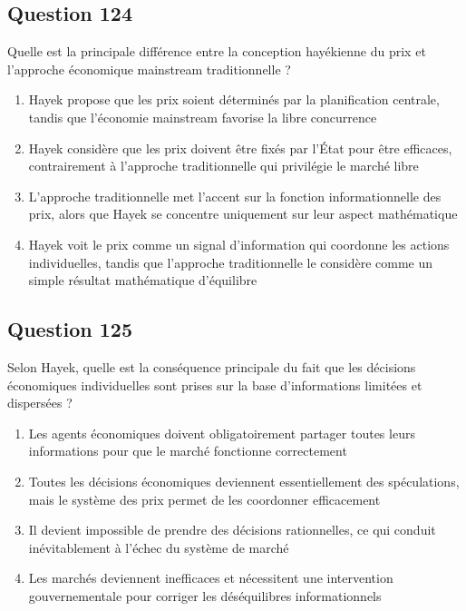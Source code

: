\documentclass[12pt,a4paper]{article}
\begin{document}
\bigskip


\subsection*{Question 124}
Quelle est la principale différence entre la conception hayékienne du prix et l'approche économique mainstream traditionnelle ?

\begin{enumerate}[label=\Alph*., leftmargin=*]
\item Hayek propose que les prix soient déterminés par la planification centrale, tandis que l'économie mainstream favorise la libre concurrence
\item Hayek considère que les prix doivent être fixés par l'État pour être efficaces, contrairement à l'approche traditionnelle qui privilégie le marché libre
\item L'approche traditionnelle met l'accent sur la fonction informationnelle des prix, alors que Hayek se concentre uniquement sur leur aspect mathématique
\item Hayek voit le prix comme un signal d'information qui coordonne les actions individuelles, tandis que l'approche traditionnelle le considère comme un simple résultat mathématique d'équilibre
\end{enumerate}

\bigskip


\subsection*{Question 125}
Selon Hayek, quelle est la conséquence principale du fait que les décisions économiques individuelles sont prises sur la base d'informations limitées et dispersées ?

\begin{enumerate}[label=\Alph*., leftmargin=*]
\item Les agents économiques doivent obligatoirement partager toutes leurs informations pour que le marché fonctionne correctement
\item Toutes les décisions économiques deviennent essentiellement des spéculations, mais le système des prix permet de les coordonner efficacement
\item Il devient impossible de prendre des décisions rationnelles, ce qui conduit inévitablement à l'échec du système de marché
\item Les marchés deviennent inefficaces et nécessitent une intervention gouvernementale pour corriger les déséquilibres informationnels
\end{enumerate}
\end{document}
